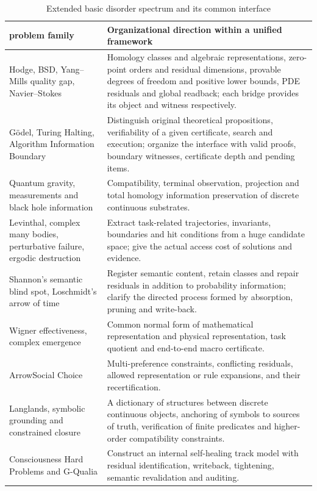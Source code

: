 \documentclass[11pt,a4paper]{article}
\theoremstyle{plain}
\theoremstyle{definition}
\theoremstyle{remark}
\begin{document}
\begin{CJK*}
\begin{table}
[htbp] \centering \small \caption { Extended basic disorder spectrum and its common interface }\label{pc:extended-table}
\begin{tabular}
{p{}p{}}\hline
problem family&
Organizational direction within a unified framework\\
\hline
Hodge, BSD, Yang--Mills quality gap, Navier--Stokes&
Homology classes and algebraic representations, zero-point orders and residual dimensions, provable degrees of freedom and positive lower bounds, PDE residuals and global readback; each bridge provides its object and witness respectively.\\
Gödel, Turing Halting, Algorithm Information Boundary&
Distinguish original theoretical propositions, verifiability of a given certificate, search and execution; organize the interface with valid proofs, boundary witnesses, certificate depth and pending items.\\
Quantum gravity, measurements and black hole information&
Compatibility, terminal observation, projection and total homology information preservation of discrete continuous substrates.\\
Levinthal, complex many bodies, perturbative failure, ergodic destruction&
Extract task-related trajectories, invariants, boundaries and hit conditions from a huge candidate space; give the actual access cost of solutions and evidence.\\
Shannon's semantic blind spot, Loschmidt's arrow of time&
Register semantic content, retain classes and repair residuals in addition to probability information; clarify the directed process formed by absorption, pruning and write-back.\\
Wigner effectiveness, complex emergence&
Common normal form of mathematical representation and physical representation, task quotient and end-to-end macro certificate.\\
ArrowSocial Choice&
Multi-preference constraints, conflicting residuals, allowed representation or rule expansions, and their recertification.\\
Langlands, symbolic grounding and constrained closure&
A dictionary of structures between discrete continuous objects, anchoring of symbols to sources of truth, verification of finite predicates and higher-order compatibility constraints.\\
Consciousness Hard Problems and G-Qualia&
Construct an internal self-healing track model with residual identification, writeback, tightening, semantic revalidation and auditing.\\
\hline
\end{tabular}
\end{table}



\end{CJK*}
\end{document}
